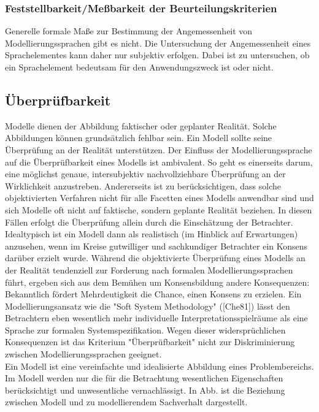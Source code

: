 \subsubsection{Feststellbarkeit/Meßbarkeit der Beurteilungskriterien} 
Generelle formale Maße zur Bestimmung der Angemessenheit von Modellierungssprachen gibt es
nicht. Die Untersuchung der Angemessenheit eines Sprachelementes kann daher nur subjektiv erfolgen.
Dabei ist zu untersuchen, ob ein Sprachelement bedeutsam für den Anwendungszweck ist oder
nicht.
\subsection{Überprüfbarkeit}
Modelle dienen der Abbildung faktischer oder geplanter Realität. Solche Abbildungen können grundsätzlich
fehlbar sein. Ein Modell sollte seine Überprüfung an der Realität unterstützen. Der Einfluss der
Modellierungssprache auf die Überprüfbarkeit eines Modells ist ambivalent. So geht es einerseits
darum, eine möglichst genaue, intersubjektiv nachvollziehbare Überprüfung an der Wirklichkeit anzustreben.
Andererseits ist zu berücksichtigen, dass solche objektivierten Verfahren nicht für alle Facetten
eines Modells anwendbar sind und sich Modelle oft nicht auf faktische, sondern geplante Realität
beziehen. In diesen Fällen erfolgt die Überprüfung allein durch die Einschätzung der Betrachter. Idealtypisch
ist ein Modell dann als realistisch (im Hinblick auf Erwartungen) anzusehen, wenn im Kreise
gutwilliger und sachkundiger Betrachter ein Konsens darüber erzielt wurde. Während die objektivierte
Überprüfung eines Modells an der Realität tendenziell zur Forderung nach formalen Modellierungssprachen
führt, ergeben sich aus dem Bemühen um Konsensbildung andere Konsequenzen: Bekanntlich
fördert Mehrdeutigkeit die Chance, einen Konsens zu erzielen. Ein Modellierungsansatz wie die
"Soft System Methodology" ([Che81]) lässt den Betrachtern eben wesentlich mehr individuelle Interpretationsspielräume
als eine Sprache zur formalen Systemspezifikation. Wegen dieser widersprüchlichen
Konsequenzen ist das Kriterium "Überprüfbarkeit" nicht zur Diskriminierung zwischen Modellierungssprachen
geeignet.\\
Ein Modell ist eine vereinfachte und idealisierte Abbildung eines Problembereichs. Im Modell werden
nur die für die Betrachtung wesentlichen Eigenschaften berücksichtigt und unwesentliche vernachlässigt.
In Abb.  ist die Beziehung zwischen Modell und zu modellierendem Sachverhalt dargestellt.
